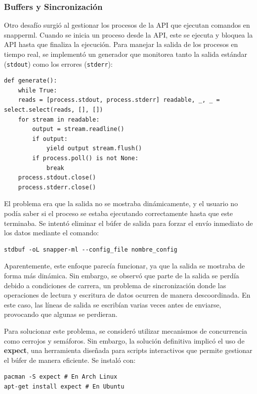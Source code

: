 \subsubsection{Buffers y Sincronización}
Otro desafío surgió al gestionar los procesos de la API que ejecutan comandos en \Gls{snapperml}. Cuando se inicia un proceso desde la API, este se ejecuta y bloquea la API hasta que finaliza la ejecución. Para manejar la salida de los procesos en tiempo real, se implementó un generador que monitorea tanto la salida estándar (\texttt{stdout}) como los errores (\texttt{stderr}):
\begin{verbatim} 
def generate(): 
    while True: 
    reads = [process.stdout, process.stderr] readable, _, _ = select.select(reads, [], []) 
    for stream in readable: 
        output = stream.readline() 
        if output: 
            yield output stream.flush() 
        if process.poll() is not None: 
            break 
    process.stdout.close() 
    process.stderr.close() 
\end{verbatim}

El problema era que la salida no se mostraba dinámicamente, y el usuario no podía saber si el proceso se estaba ejecutando correctamente hasta que este terminaba. Se intentó eliminar el búfer de salida para forzar el envío inmediato de los datos mediante el comando:
\begin{verbatim} 
stdbuf -oL snapper-ml --config_file nombre_config
\end{verbatim}

Aparentemente, este enfoque parecía funcionar, ya que la salida se mostraba de forma más dinámica. Sin embargo, se observó que parte de la salida se perdía debido a condiciones de carrera, un problema de sincronización donde las operaciones de lectura y escritura de datos ocurren de manera descoordinada. En este caso, las líneas de salida se escribían varias veces antes de enviarse, provocando que algunas se perdieran.

Para solucionar este problema, se consideró utilizar mecanismos de concurrencia como cerrojos y semáforos. Sin embargo, la solución definitiva implicó el uso de \textbf{expect}, una herramienta diseñada para scripts interactivos que permite gestionar el búfer de manera eficiente. Se instaló con:

\begin{verbatim} 
pacman -S expect # En Arch Linux 
apt-get install expect # En Ubuntu 
\end{verbatim}

